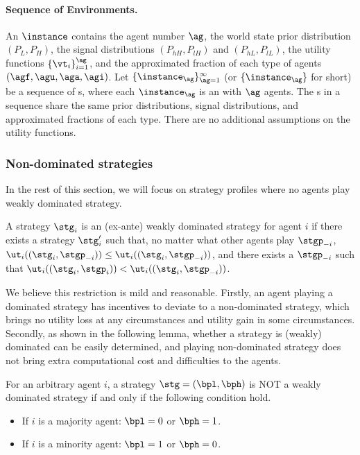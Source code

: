 \paragraph{Sequence of Environments.} An \textinst{} $\instance$  contains the agent number $\ag$, the world state prior distribution $(P_L, P_H)$, the signal distributions $(P_{hH}, P_{lH})$ and $(P_{hL}, P_{lL})$, the utility functions $\{\vt_i\}_{i=1}^\ag$, and the approximated fraction of each type of agents $(\agf, \agu, \aga, \agi)$. Let $\{\instance_\ag\}_{\ag=1}^{\infty}$ (or $\{\instance_\ag\}$ for short) be a sequence of \textinst{}s, where each $\instance_\ag$ is an \textinst{} with $\ag$ agents.
The \textinst{}s in a sequence share the same prior distributions, signal distributions, and approximated fractions of each type. There are no additional assumptions on the utility functions. 

\subsubsection{Non-dominated strategies}

In the rest of this section, we will focus on strategy profiles where no agents play weakly dominated strategy. 

\begin{definition}
    A strategy $\stg_i$ is an (ex-ante) weakly dominated strategy for agent $i$ if there exists a strategy $\stg'_i$ such that, no matter what other agents play $\stgp_{-i}$, $\ut_i((\stg_i, \stgp_{-i})) \le \ut_i((\stg_i, \stgp_{-i}))$, and there exists a $\stgp_{-i}$ such that $\ut_i((\stg_i, \stgp_i)) < \ut_i((\stg_i, \stgp_{-i}))$. 
\end{definition}

We believe this restriction is mild and reasonable. Firstly, an agent playing a dominated strategy has incentives to deviate to a non-dominated strategy, which brings no utility loss at any circumstances and utility gain in some circumstances. Secondly, as shown in the following lemma, whether a strategy is (weakly) dominated can be easily determined, and playing non-dominated strategy does not bring extra computational cost and difficulties to the agents. 

\begin{lemma}
\label{lem:dominated}
    For an arbitrary agent $i$, a strategy $\stg = (\bpl, \bph)$ is NOT a weakly dominated strategy if and only if the following condition hold. 
    \begin{itemize}
        \item If $i$ is a majority agent: $\bpl = 0$ or $\bph = 1$. 
        \item If $i$ is a minority agent: $\bpl = 1$ or $\bph = 0$. 
    \end{itemize}
\end{lemma}

